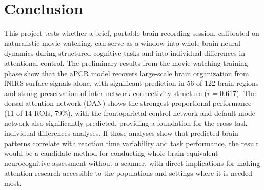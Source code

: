 
\section{Conclusion}

This project tests whether a brief, portable brain recording session, calibrated on naturalistic movie-watching, can serve as a window into whole-brain neural dynamics during structured cognitive tasks and into individual differences in attentional control. The preliminary results from the movie-watching training phase show that the aPCR model recovers large-scale brain organization from fNIRS surface signals alone, with significant prediction in 56 of 122 brain regions and strong preservation of inter-network connectivity structure ($r = 0.617$). The dorsal attention network (DAN) shows the strongest proportional performance (11 of 14 ROIs, 79\%), with the frontoparietal control network and default mode network also significantly predicted, providing a foundation for the cross-task individual differences analyses. If those analyses show that predicted brain patterns correlate with reaction time variability and task performance, the result would be a candidate method for conducting whole-brain-equivalent neurocognitive assessment without a scanner, with direct implications for making attention research accessible to the populations and settings where it is needed most.
